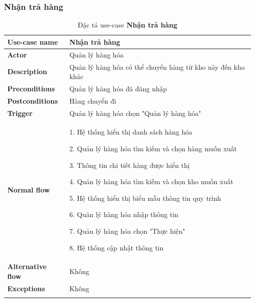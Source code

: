 \subsubsection{Nhận trả hàng}
{
    \setlength\extrarowheight{6pt}
    \begin{longtable}{| p{} | p{} |}
        \hline
        \textbf{Use-case name}
         &
        Nhận trả hàng
        \\
        \hline
        \textbf{Actor}
         &
        Quản lý hàng hóa
        \\
        \hline
        \textbf{Description}
         &
        Quản lý hàng hóa có thể chuyển hàng từ kho này đến kho khác
        \\
        \hline
        \textbf{Preconditions}
         &
        Quản lý hàng hóa đã đăng nhập
        \\
        \hline
        \textbf{Postconditions}
         &
        Hàng chuyển đi
        \\
        \hline
        \textbf{Trigger}
         &
        Quản lý hàng hóa chọn "Quản lý hàng hóa"
        \\
        \hline
        \begin{flushleft}
            \textbf{Normal flow}
        \end{flushleft}
         &
        1. Hệ thống hiển thị danh sách hàng hóa

        2. Quản lý hàng hóa tìm kiếm và chọn hàng muốn xuất

        3. Thông tin chi tiết hàng được hiển thị

        4. Quản lý hàng hóa tìm kiếm và chọn kho muốn xuất

        5. Hệ thống hiển thị biểu mẫu thông tin quy trình

        6. Quản lý hàng hóa nhập thông tin

        7. Quản lý hàng hóa chọn "Thực hiện"

        8. Hệ thống cập nhật thông tin
        \\
        \hline
        \textbf{Alternative flow}
         &
        Không
        \\
        \hline
        \textbf{Exceptions}
         &
        Không
        \\
        \hline
        \caption{Đặc tả use-case \textbf{Nhận trả hàng}}
    \end{longtable}
}

